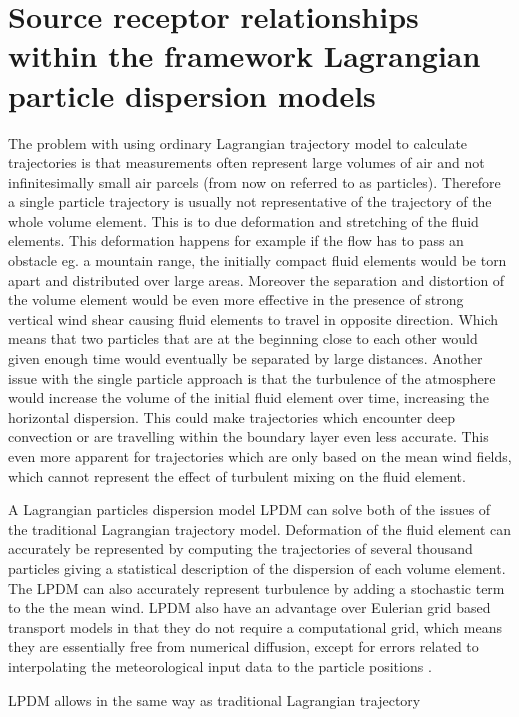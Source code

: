 
\chapter{Source receptor relationships within the framework Lagrangian particle dispersion models}

The problem with using ordinary Lagrangian trajectory model to calculate trajectories is that measurements 
often represent large volumes of air and not infinitesimally small air parcels (from now on referred to as 
particles). Therefore a single particle trajectory is usually not representative of the trajectory of the 
whole volume element. This is to due deformation and stretching of the fluid elements. This deformation 
happens for example if the flow has to pass an obstacle eg. a mountain range, the initially compact fluid 
elements would be torn apart and distributed over large areas. Moreover the separation and distortion of the
volume element would be even more effective in the presence of strong vertical wind shear causing fluid 
elements to travel in opposite direction. Which means that two particles that are at the beginning close to 
each other would given enough time would eventually be separated by large distances. Another issue with the 
single particle approach is that the turbulence of the atmosphere would increase the volume of the initial 
fluid element over time, increasing the horizontal dispersion. This could make trajectories which encounter 
deep convection or are travelling within the boundary layer even less accurate. This even more apparent for 
trajectories which are only based on the mean wind fields, which cannot represent the effect of turbulent 
mixing on the fluid element. \par A Lagrangian particles dispersion model LPDM can solve both of the issues 
of the traditional Lagrangian trajectory model. Deformation of the fluid element can accurately be 
represented by computing the trajectories of several thousand particles giving a statistical description of 
the dispersion of each volume element. The LPDM can also accurately represent turbulence by adding a 
stochastic term to the the mean wind. 
LPDM also have an advantage over Eulerian grid based transport models in that they do not require a 
computational grid, which means they are essentially free from numerical diffusion, except for errors 
related to interpolating the meteorological input data to the particle positions 
\parencite{cassiani_offline_2016}. \par LPDM allows in the same way as traditional Lagrangian trajectory 
